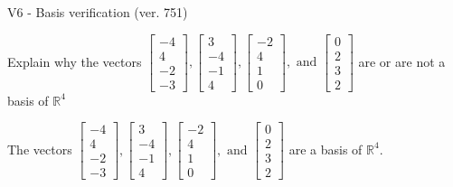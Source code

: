 \begin{exercise}
  \begin{exerciseTitle}V6 - Basis verification (ver. 751)\end{exerciseTitle}
  \begin{exerciseStatement}
    Explain why the vectors \(\left[\begin{array}{r}
-4 \\
4 \\
-2 \\
-3
\end{array}\right] , \left[\begin{array}{r}
3 \\
-4 \\
-1 \\
4
\end{array}\right] , \left[\begin{array}{r}
-2 \\
4 \\
1 \\
0
\end{array}\right] , \text{ and } \left[\begin{array}{r}
0 \\
2 \\
3 \\
2
\end{array}\right]\) are or are not a basis of \(\mathbb{R}^4\)	


  \end{exerciseStatement}
  \begin{exerciseAnswer}
   The vectors \(\left[\begin{array}{r}
-4 \\
4 \\
-2 \\
-3
\end{array}\right] , \left[\begin{array}{r}
3 \\
-4 \\
-1 \\
4
\end{array}\right] , \left[\begin{array}{r}
-2 \\
4 \\
1 \\
0
\end{array}\right] , \text{ and } \left[\begin{array}{r}
0 \\
2 \\
3 \\
2
\end{array}\right]\) 
  	 are  a basis of \(\mathbb{R}^4\).
  


  \end{exerciseAnswer}
\end{exercise}